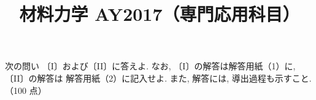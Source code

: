 \documentclass[11pt,a4paper]{article}
\title{材料力学 AY2017（専門応用科目）}
\author{}
\date{}
\begin{document}
\maketitle

\noindent
次の問い 〔I〕および〔II〕に答えよ. なお, 〔I〕の解答は解答用紙（1）に, 〔II〕の解答は
解答用紙（2）に記入せよ. また, 解答には, 導出過程も示すこと.\hfill（100 点）

\bigskip

\clearpage

\end{document}
